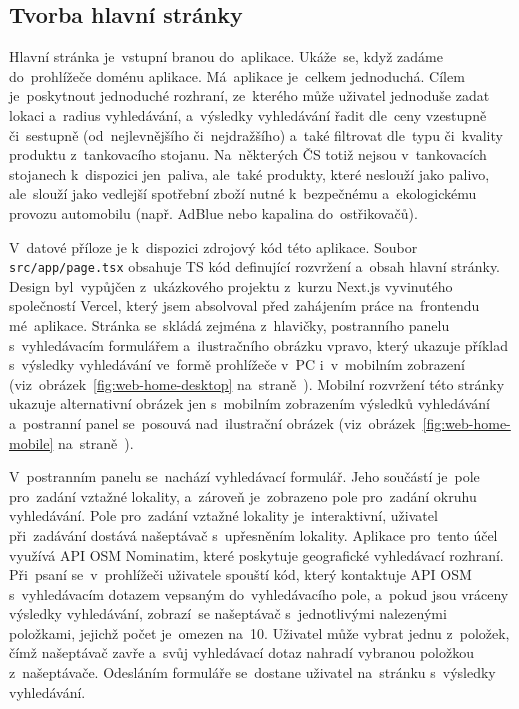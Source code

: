 \subsection{Tvorba hlavní stránky}

Hlavní stránka je~vstupní branou do~aplikace. Ukáže~se, když zadáme
do~prohlížeče doménu aplikace. Má~aplikace je~celkem jednoduchá. Cílem
je~poskytnout jednoduché rozhraní, ze~kterého může uživatel jednoduše
zadat lokaci a~radius vyhledávání, a~výsledky vyhledávání řadit dle~ceny
vzestupně či~sestupně (od~nejlevnějšího či~nejdražšího) a~také filtrovat
dle~typu či~kvality produktu z~tankovacího stojanu. Na~některých ČS totiž
nejsou v~tankovacích stojanech k~dispozici jen~paliva, ale~také produkty,
které neslouží jako palivo, ale~slouží jako vedlejší spotřební zboží nutné
k~bezpečnému a~ekologickému provozu automobilu (např. AdBlue nebo kapalina
do~ostřikovačů).

V~datové příloze je k~dispozici zdrojový kód této aplikace. Soubor
\texttt{src/app/page.tsx} obsahuje TS kód definující rozvržení a~obsah
hlavní stránky. Design byl~vypůjčen z~ukázkového projektu z~kurzu Next.js
vyvinutého společností Vercel, který jsem absolvoval před zahájením práce
na~frontendu mé~aplikace. Stránka se~skládá zejména z~hlavičky,
postranního panelu s~vyhledávacím formulářem a~ilustračního obrázku vpravo,
který ukazuje příklad s~výsledky vyhledávání ve~formě prohlížeče v~PC
i~v~mobilním zobrazení (viz~obrázek~\ref{fig:web-home-desktop}
na~straně~\pageref{fig:web-home-desktop}). Mobilní rozvržení této stránky
ukazuje alternativní obrázek jen s~mobilním zobrazením výsledků vyhledávání
a~postranní panel se~posouvá nad~ilustrační obrázek
(viz~obrázek~\ref{fig:web-home-mobile}
na~straně~\pageref{fig:web-home-mobile}).

V~postranním panelu se~nachází vyhledávací formulář. Jeho součástí je~pole
pro~zadání vztažné lokality, a~zároveň je~zobrazeno pole pro~zadání okruhu
vyhledávání. Pole pro~zadání vztažné lokality je~interaktivní, uživatel
při~zadávání dostává našeptávač s~upřesněním lokality. Aplikace pro~tento účel
využívá API OSM Nominatim, které poskytuje geografické vyhledávací rozhraní.
Při~psaní se~v~prohlížeči uživatele spouští kód, který kontaktuje API OSM
s~vyhledávacím dotazem vepsaným do~vyhledávacího pole, a~pokud jsou vráceny
výsledky vyhledávání, zobrazí~se našeptávač s~jednotlivými nalezenými
položkami, jejichž počet je~omezen na~10. Uživatel může vybrat jednu
z~položek, čímž našeptávač zavře a~svůj vyhledávací dotaz nahradí vybranou
položkou z~našeptávače. Odesláním formuláře se~dostane uživatel na~stránku
s~výsledky vyhledávání.

